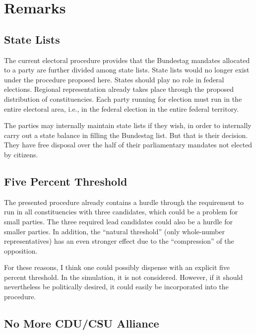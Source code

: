 \section{Remarks}

\subsection{State Lists}

The current electoral procedure provides that the Bundestag mandates allocated to a party
are further divided among state lists. State lists would no longer exist under the procedure proposed here.
States should play no role in federal elections. Regional
representation already takes place through the proposed distribution of constituencies.
Each party running for election must run in the entire electoral area, i.e., in the federal election in the
entire federal territory.

The parties may internally maintain state lists if they wish, in order to internally carry out a
state balance in filling the Bundestag list. But that is their
decision. They have free disposal over the half of their parliamentary mandates not elected by citizens.

\subsection{Five Percent Threshold}

The presented procedure already contains a hurdle through the requirement to run in all constituencies with three candidates,
which could be a problem for small parties. The three
required lead candidates could also be a hurdle for smaller parties. In addition,
the \enquote{natural threshold} (only whole-number representatives) has an even stronger effect due to the
\enquote{compression} of the opposition.

For these reasons, I think one could possibly dispense with an explicit five percent threshold.
In the simulation, it is not considered. However, if it should nevertheless be politically desired,
it could easily be incorporated into the procedure.

\subsection{No More CDU/CSU Alliance}

